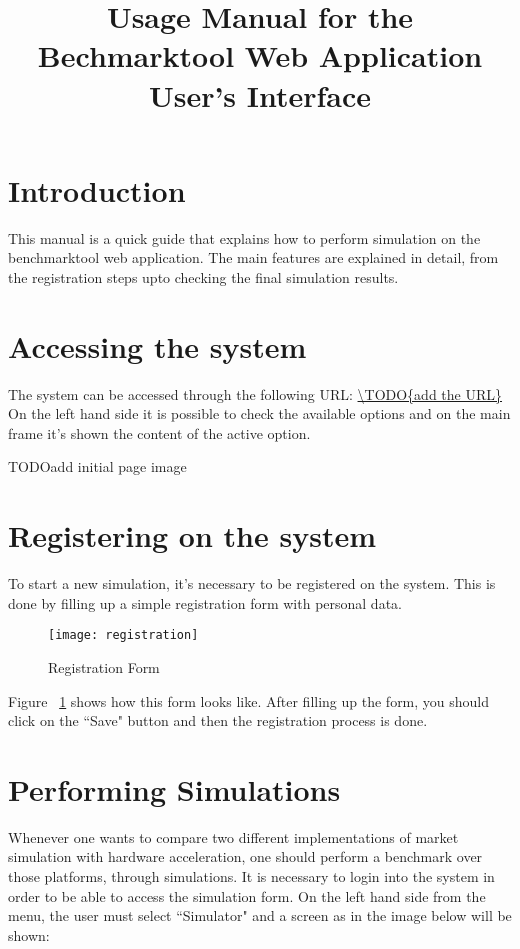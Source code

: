 \documentclass[11pt,a4paper]{article}
\title{Usage Manual for the Bechmarktool Web Application User's Interface}
\begin{document}
\maketitle
\tableofcontents

\section{Introduction}
This manual is a quick guide that explains how to perform simulation on the benchmarktool web application.
The main features are explained in detail, from the registration steps upto checking the final simulation results.

\section{Accessing the system}
The system can be accessed through the following URL:
\noindent\url{\TODO{add the URL}}
On the left hand side it is possible to check the available options and on the main frame it's shown the content of the active option.

TODO{add initial page image}

\section{Registering on the system}
To start a new simulation, it's necessary to be registered on the system. 
This is done by filling up a simple registration form with personal data.
\begin{figure}[h]
	\begin{center}
		\texttt{[image: registration]}
		\caption{Registration Form\label{fig:registration}}
	\end{center}
\end{figure}

Figure ~\ref{fig:registration} shows how this form looks like.
After filling up the form, you should click on the ``Save" button and then the registration process is done.

\section{Performing Simulations}
Whenever one wants to compare two different implementations of market simulation with hardware acceleration, one should perform a benchmark over those platforms, through simulations. 
It is necessary to login into the system in order to be able to access the simulation form.
On the left hand side from the menu, the user must select ``Simulator" and a screen as in the image below will be shown:
\end{document}
